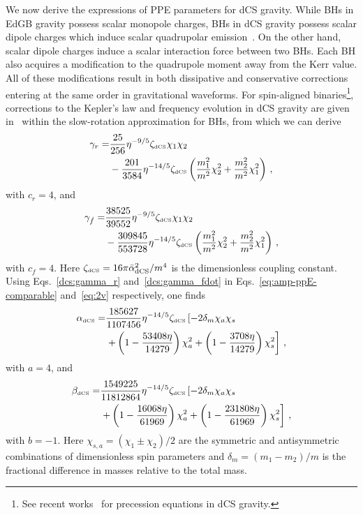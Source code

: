 \documentclass[prd,twocolumn,nofootinbib]{revtex4-1}
\newcommand{\DCS}{{\mbox{\tiny dCS}}}
\begin{document}
We now derive the expressions of PPE parameters for dCS gravity. While BHs in EdGB gravity possess scalar monopole charges, BHs in dCS gravity possess scalar dipole charges which induce scalar quadrupolar emission~\cite{Yagi:2011xp}. On the other hand, scalar dipole charges induce a scalar interaction force between two BHs. Each BH also acquires a modification to the quadrupole moment away from the Kerr value. All of these modifications result in both dissipative and conservative corrections entering at the same order in gravitational waveforms. For spin-aligned binaries\footnote{See recent works~\cite{Loutrel:2018rxs,Loutrel:2018ydv} for precession equations in dCS gravity.}, corrections to the Kepler's law and frequency evolution in dCS gravity are given in~\cite{Yagi:2012vf} within the slow-rotation approximation for BHs, from which we can derive
\begin{align}\label{dcs:gamma_r}
\gamma_r=&\frac{25}{256}\eta^{-9/5}\zeta_{\DCS}\chi_1 \chi_2 \nonumber \\ 
&-\frac{201}{3584}\eta^{-14/5}\zeta_{\DCS} \left(\frac{m_1^2}{m^2}\chi_2^2 +\frac{m_2^2}{m^2}\chi_1^2\right)\,,
\end{align}
with $c_r=4$, and
 \begin{align}\label{dcs:gamma_fdot}
\gamma_{\dot{f}}=& \frac{38525}{39552}\eta^{-9/5}\zeta_{\DCS}\chi_1 \chi_2 \nonumber \\
&-\frac{309845}{553728 }\eta^{-14/5}\zeta_{\DCS} \left(\frac{m_1^2}{m^2}\chi_2^2+\frac{m_2^2}{m^2}\chi_1^2\right)\,,
 \end{align}
with $c_{\dot{f}}=4$. Here $\zeta_{\DCS}=16\pi \bar{\alpha}_{\text{dCS}}^2/m^4$ is the dimensionless coupling constant.
Using Eqs.~\eqref{dcs:gamma_r} and~\eqref{dcs:gamma_fdot} in Eqs.~\eqref{eq:amp-ppE-comparable} and~\eqref{eq:2v} respectively, one finds
 \begin{align}
 \alpha_{\DCS}=&\frac{185627}{1107456}\eta ^{-14/5}\zeta_{\DCS} \left[-2 \delta_m \chi_a \chi_s \right. \nonumber\\ 
 &\left. +\left(1-\frac{53408 \eta }{14279}\right) \chi_a^2+\left(1-\frac{3708 \eta }{14279}\right) \chi_s^2\right]\,,
 \end{align}
with $a=4$, and
 \begin{align}
 \beta_{\DCS}=&\frac{1549225}{11812864}\eta ^{-14/5} \zeta_{\DCS} \left[-2 \delta_m \chi_a \chi_s \right.\nonumber\\ 
 &\left. +\left(1-\frac{16068 \eta }{61969}\right)\chi_a^2 +\left(1-\frac{231808 \eta }{61969}\right)\chi_s^2\right]\,,
 \end{align}
with $b=-1$. Here $\chi_{s,a}=(\chi_1 \pm \chi_2 )/2$ are the symmetric and antisymmetric combinations of dimensionless spin parameters 
and $\delta_m=(m_1-m_2)/m$ is the fractional difference in masses relative to the total mass.
\end{document}
